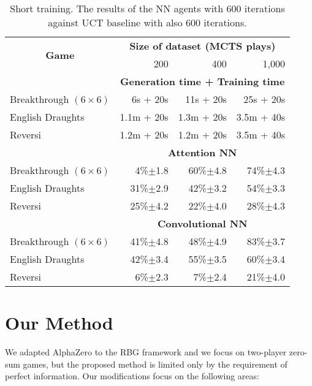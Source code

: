 \documentclass[letterpaper]{article} %
\begin{document}
\begin{table}[!ht]\small\centering\renewcommand{\arraystretch}{1.1}\setlength\tabcolsep{4.9pt}
\newcommand{\cb}[1]{{\scriptsize $\pm$#1}}%
\begin{tabular}{|l|r|r|r|}\hline
\multicolumn{1}{|c|}{\multirow{2}{*}{\bf Game}} & \multicolumn{3}{c|}{\bf Size of dataset (MCTS plays)} \\
                          & 200 & 400 & 1,000 \\\hline
                          & \multicolumn{3}{c|}{\bf Generation time + Training time} \\
Breakthrough $(6\times6)$ & 6s   + 20s &  11s + 20s & 25s + 20s \\
English Draughts          & 1.1m + 20s & 1.3m + 20s & 3.5m + 40s \\
Reversi                   & 1.2m + 20s & 1.2m + 20s & 3.5m + 40s \\\hline
                          & \multicolumn{3}{c|}{\bf Attention NN} \\
Breakthrough $(6\times6)$ & 4\%\cb{1.8} & 60\%\cb{4.8} & 74\%\cb{4.3} \\
English Draughts          & 31\%\cb{2.9} & 42\%\cb{3.2} & 54\%\cb{3.3} \\
Reversi                   & 25\%\cb{4.2} & 22\%\cb{4.0} & 28\%\cb{4.3} \\\hline
                          & \multicolumn{3}{c|}{\bf Convolutional NN} \\
Breakthrough $(6\times6)$ & 41\%\cb{4.8} & 48\%\cb{4.9} & 83\%\cb{3.7} \\
English Draughts          & 42\%\cb{3.4} & 55\%\cb{3.5} & 60\%\cb{3.4} \\
Reversi                   & 6\%\cb{2.3} & 7\%\cb{2.4} & 21\%\cb{4.0} \\\hline

\end{tabular}
\caption{Short training. The results of the NN agents with 600 iterations against UCT baseline with also 600 iterations.} \label{tab:fast}
\end{table}

\section{Our Method}

We adapted AlphaZero to the RBG framework and we focus on two-player zero-sum games, but the proposed method is limited only by the requirement of perfect information.
Our modifications focus on the following areas:
\end{document}
